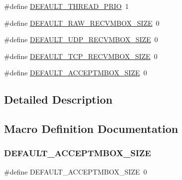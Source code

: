 \begin{DoxyCompactItemize}
\item 
\#define \hyperlink{group__lwip__opts__thread_ga3d8715b1fdd0449d6c214e4a40108456}{D\+E\+F\+A\+U\+L\+T\+\_\+\+T\+H\+R\+E\+A\+D\+\_\+\+P\+R\+IO}~1
\item 
\#define \hyperlink{group__lwip__opts__thread_ga4ef8f046c957750056131310a1580df7}{D\+E\+F\+A\+U\+L\+T\+\_\+\+R\+A\+W\+\_\+\+R\+E\+C\+V\+M\+B\+O\+X\+\_\+\+S\+I\+ZE}~0
\item 
\#define \hyperlink{group__lwip__opts__thread_ga09fe785559b3f0cf108da4440489e335}{D\+E\+F\+A\+U\+L\+T\+\_\+\+U\+D\+P\+\_\+\+R\+E\+C\+V\+M\+B\+O\+X\+\_\+\+S\+I\+ZE}~0
\item 
\#define \hyperlink{group__lwip__opts__thread_ga1bd172938b9c8ba63156fcafc87e83c7}{D\+E\+F\+A\+U\+L\+T\+\_\+\+T\+C\+P\+\_\+\+R\+E\+C\+V\+M\+B\+O\+X\+\_\+\+S\+I\+ZE}~0
\item 
\#define \hyperlink{group__lwip__opts__thread_ga5d5a6e04abe2ec233c7acdb09f992461}{D\+E\+F\+A\+U\+L\+T\+\_\+\+A\+C\+C\+E\+P\+T\+M\+B\+O\+X\+\_\+\+S\+I\+ZE}~0
\end{DoxyCompactItemize}


\subsection{Detailed Description}


\subsection{Macro Definition Documentation}
\mbox{\label{group__lwip__opts__thread_ga5d5a6e04abe2ec233c7acdb09f992461}} 
\subsubsection{\texorpdfstring{D\+E\+F\+A\+U\+L\+T\+\_\+\+A\+C\+C\+E\+P\+T\+M\+B\+O\+X\+\_\+\+S\+I\+ZE}{DEFAULT\_ACCEPTMBOX\_SIZE}\hspace{0.1cm}{\footnotesize\ttfamily [1/2]}}
{\footnotesize\ttfamily \#define D\+E\+F\+A\+U\+L\+T\+\_\+\+A\+C\+C\+E\+P\+T\+M\+B\+O\+X\+\_\+\+S\+I\+ZE~0}


